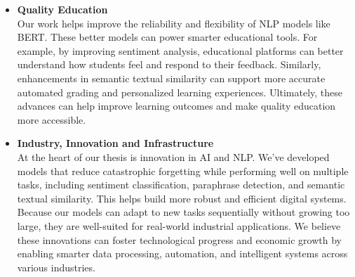 \documentclass[a4paper, 11pt, oneside]{uet_thesis}  %
\begin{document}
\begin{itemize}
    \item \textbf{Quality Education} \\
    Our work helps improve the reliability and flexibility of NLP models like BERT. These better models can power smarter educational tools. For example, by improving sentiment analysis, educational platforms can better understand how students feel and respond to their feedback. Similarly, enhancements in semantic textual similarity can support more accurate automated grading and personalized learning experiences. Ultimately, these advances can help improve learning outcomes and make quality education more accessible.

    \item \textbf{Industry, Innovation and Infrastructure} \\
    At the heart of our thesis is innovation in AI and NLP. We’ve developed models that reduce catastrophic forgetting while performing well on multiple tasks, including sentiment classification, paraphrase detection, and semantic textual similarity. This helps build more robust and efficient digital systems. Because our models can adapt to new tasks sequentially without growing too large, they are well-suited for real-world industrial applications. We believe these innovations can foster technological progress and economic growth by enabling smarter data processing, automation, and intelligent systems across various industries.
\end{itemize}


\clearpage	%

\pagestyle{fancy}  %

\tableofcontents  %

\listoffigures  %

\listoftables  %
\end{document}
